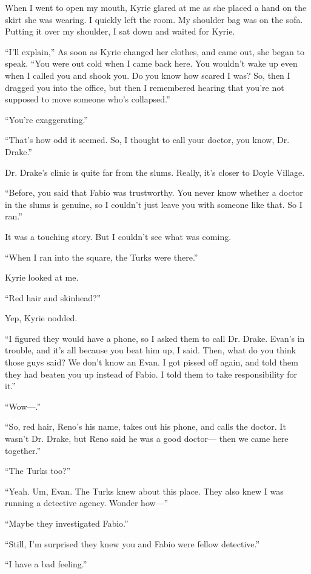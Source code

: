 \documentclass[oneside]{book}
\begin{document}
When I went to open my mouth, Kyrie glared at me as she placed a hand on the skirt she was wearing. I quickly left the room. My shoulder bag was on the sofa. Putting it over my shoulder, I sat down and waited for Kyrie.

“I’ll explain,” As soon as Kyrie changed her clothes, and came out, she began to speak. “You were out cold when I came back here. You wouldn’t wake up even when I called you and shook you. Do you know how scared I was? So, then I dragged you into the office, but then I remembered hearing that you’re not supposed to move someone who’s collapsed.”

“You’re exaggerating.”

“That’s how odd it seemed. So, I thought to call your doctor, you know, Dr. Drake.”

Dr. Drake’s clinic is quite far from the slums. Really, it’s closer to Doyle Village.

“Before, you said that Fabio was trustworthy. You never know whether a doctor in the slums is genuine, so I couldn’t just leave you with someone like that. So I ran.”

It was a touching story. But I couldn’t see what was coming.

“When I ran into the square, the Turks were there.”

Kyrie looked at me.

“Red hair and skinhead?”

Yep, Kyrie nodded.

“I figured they would have a phone, so I asked them to call Dr. Drake. Evan’s in trouble, and it’s all because you beat him up, I said. Then, what do you think those guys said? We don’t know an Evan. I got pissed off again, and told them they had beaten you up instead of Fabio. I told them to take responsibility for it.”

“Wow—.”

“So, red hair, Reno’s his name, takes out his phone, and calls the doctor. It wasn’t Dr. Drake, but Reno said he was a good doctor— then we came here together.”

“The Turks too?”

“Yeah. Um, Evan. The Turks knew about this place. They also knew I was running a detective agency. Wonder how—”

“Maybe they investigated Fabio.”

“Still, I’m surprised they knew you and Fabio were fellow detective.”

“I have a bad feeling.”
\end{document}
